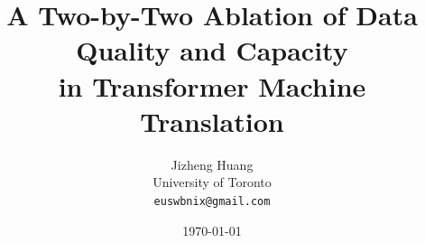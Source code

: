 \documentclass[11pt,a4paper]{article}
\title{A Two-by-Two Ablation of Data Quality and Capacity\\
  in Transformer Machine Translation}
\author{
  Jizheng Huang \\
  University of Toronto \\
  \texttt{euswbnix@gmail.com}
}
\date{\today}
\begin{document}
\maketitle

\begin{abstract}

\end{abstract}













\end{document}
